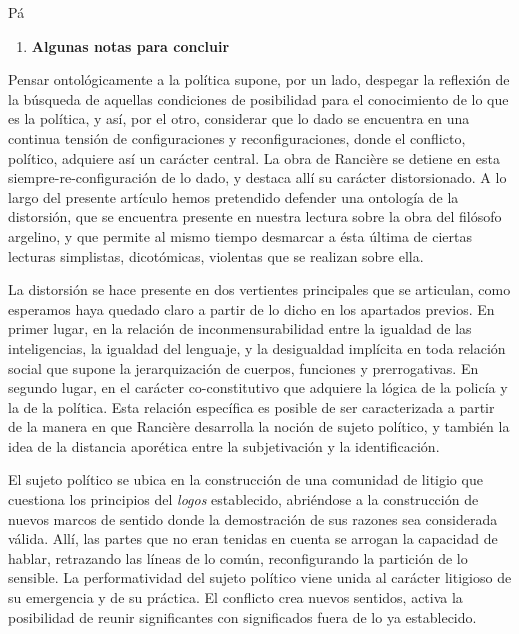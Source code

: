 Pá

\begin{enumerate}
\def\labelenumi{\arabic{enumi}.}
\item
  \textbf{Algunas notas para concluir}
\end{enumerate}

Pensar ontológicamente a la política supone, por un lado, despegar la reflexión de la búsqueda de aquellas condiciones de posibilidad para el conocimiento de lo que es la política, y así, por el otro, considerar que lo dado se encuentra en una continua tensión de configuraciones y reconfiguraciones, donde el conflicto, político, adquiere así un carácter central. La obra de Rancière se detiene en esta siempre-re-configuración de lo dado, y destaca allí su carácter distorsionado. A lo largo del presente artículo hemos pretendido defender una ontología de la distorsión, que se encuentra presente en nuestra lectura sobre la obra del filósofo argelino, y que permite al mismo tiempo desmarcar a ésta última de ciertas lecturas simplistas, dicotómicas, violentas que se realizan sobre ella.

La distorsión se hace presente en dos vertientes principales que se articulan, como esperamos haya quedado claro a partir de lo dicho en los apartados previos. En primer lugar, en la relación de inconmensurabilidad entre la igualdad de las inteligencias, la igualdad del lenguaje, y la desigualdad implícita en toda relación social que supone la jerarquización de cuerpos, funciones y prerrogativas. En segundo lugar, en el carácter co-constitutivo que adquiere la lógica de la policía y la de la política. Esta relación específica es posible de ser caracterizada a partir de la manera en que Rancière desarrolla la noción de sujeto político, y también la idea de la distancia aporética entre la subjetivación y la identificación.

El sujeto político se ubica en la construcción de una comunidad de litigio que cuestiona los principios del\emph{ logos} establecido, abriéndose a la construcción de nuevos marcos de sentido donde la demostración de sus razones sea considerada válida. Allí, las partes que no eran tenidas en cuenta se arrogan la capacidad de hablar, retrazando las líneas de lo común, reconfigurando la partición de lo sensible. La performatividad del sujeto político viene unida al carácter litigioso de su emergencia y de su práctica. El conflicto crea nuevos sentidos, activa la posibilidad de reunir significantes con significados fuera de lo ya establecido.

